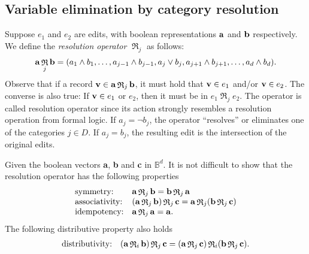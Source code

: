 \documentclass[11pt, fleqn, a4paper]{article}
\DeclareMathOperator{\res}{\mathfrak{R}}
\begin{document}
\subsection{Variable elimination by category resolution}
Suppose $e_1$ and $e_2$ are edits, with boolean representations ${\bf a}$ and ${\bf b}$ respectively.
We define the {\em resolution operator} $\res_j$ as follows:
\begin{eqnarray}
    {\bf a} \res_j {\bf b} = (a_1\land b_1,\ldots,a_{j-1}\land b_{j-1},a_{j}\lor b_{j},a_{j+1}\land b_{j+1},\ldots,a_d\land b_d). 
\end{eqnarray}
Observe that if a record ${\bf v}\in {\bf a}\res_j{\bf b}$, it must hold that
${\bf v}\in e_1$ and/or ${\bf v}\in e_2$.  The converse is also true: If ${\bf
v}\in e_1$ or $e_2$, then it must be in $e_1\res_j e_2$.  The operator is
called resolution operator since its action strongly resembles a resolution
operation from formal logic.  If $a_j= \lnot b_j$, the operator ``resolves'' or
eliminates one of the categories $j\in D$. If $a_j=b_j$, the resulting edit is
the intersection of the original edits.

Given the boolean vectors {\bf a}, {\bf b} and {\bf c} in $\mathbb{B}^d$. It is
not difficult to show that the resolution operator has the following properties 
\begin{equation}
\begin{array}{ll}
\textrm{symmetry:}  &{\bf a}\res_j{\bf b} = {\bf b} \res_j {\bf a} \\
\textrm{associativity:}& ({\bf a}\res_j{\bf b})\res_j {\bf c} = {\bf a}\res_j({\bf b}\res_j {\bf c})\\
\textrm{idempotency:} &{\bf a}\res_j {\bf a} = {\bf a}.
\end{array}
\end{equation}
The following distributive property also holds
\begin{equation}
\begin{array}{ll}
\textrm{distributivity:}& ({\bf a}\res_i{\bf b})\res_j{\bf c} = ({\bf a}\res_j{\bf c})\res_i({\bf b}\res_j{\bf c}).
\end{array}
\end{equation}









\end{document}
